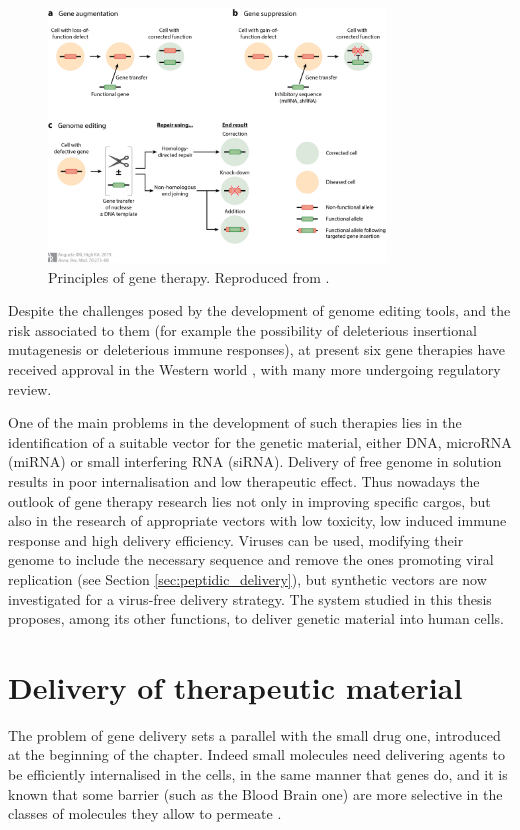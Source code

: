 \begin{figure}[t]
\begin{center}
\includegraphics[width = 0.8\textwidth]{1introduction/pics/gene_therapy.jpeg}
\caption[Principles of gene therapy]{Principles of gene therapy. Reproduced from \citet{Anguela2019}.} \label{fig:gene_therapy}
\end{center}
\end{figure}

Despite the challenges posed by the development of genome editing tools, and the risk associated to them (for example the possibility of deleterious insertional mutagenesis or deleterious immune responses), at present six gene therapies have received approval in the Western world \citep{Anguela2019}, with many more undergoing regulatory review. 

One of the main problems in the development of such therapies lies in the identification of a suitable vector for the genetic material, either DNA, microRNA (miRNA) or small interfering RNA (siRNA). 
%
Delivery of free genome in solution results in poor internalisation and low therapeutic effect.
%
Thus nowadays the outlook of gene therapy research lies not only in improving specific cargos, but also in the research of appropriate vectors with low toxicity, low induced immune response and high delivery efficiency. Viruses can be used, modifying their genome to include the necessary sequence and remove the ones promoting viral replication \citep{Naldini2011,Mingozzi2011} (see Section \ref{sec:peptidic_delivery}), but synthetic vectors are now investigated for a virus-free delivery strategy. The system studied in this thesis proposes, among its other functions, to deliver genetic material into human cells.


\section{Delivery of therapeutic material}
The problem of gene delivery sets a parallel with the small drug one, introduced at the beginning of the chapter. Indeed small molecules need delivering agents to be efficiently internalised in the cells, in the same manner that genes do, and it is known that some barrier (such as the Blood Brain one) are more selective in the classes of molecules they allow to permeate \citep{Pattni2015, Krol2012}.

